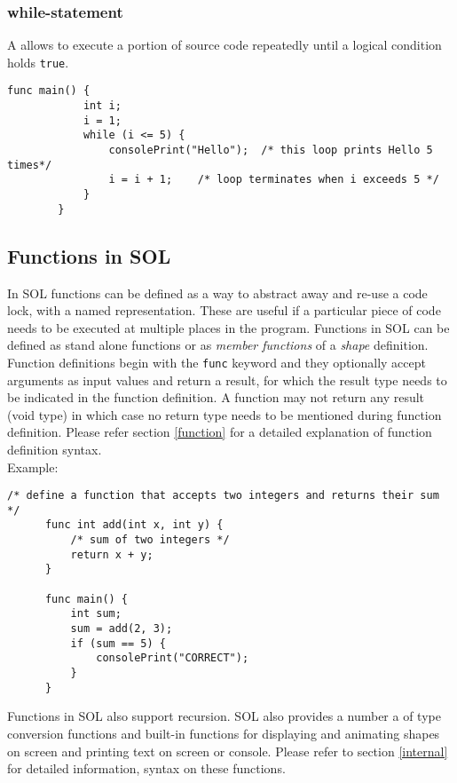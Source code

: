 \documentclass[letterpaper,12pt]{report}
\begin{document}
      \subsubsection{while-statement}
      A  allows to execute a portion of source code repeatedly until a logical condition holds \texttt{true}.
      \begin{lstlisting}[style=sol]
        func main() {
            int i;
            i = 1;
            while (i <= 5) {
                consolePrint("Hello");  /* this loop prints Hello 5 times*/
                i = i + 1;    /* loop terminates when i exceeds 5 */
            }
        }
      \end{lstlisting}

    \subsection{Functions in SOL}
    In SOL functions can be defined as a way to abstract away and re-use a code lock, with a named representation. These are useful if a particular piece of code needs to be executed at multiple places in the program. Functions in SOL can be defined as stand alone functions or as \textit{member functions} of a \textit{shape} definition. Function definitions begin with the \texttt{func} keyword and they optionally accept arguments as input values and return a result, for which the result type needs to be indicated in the function definition. A function may not return any result (void type) in which case no return type needs to be mentioned during function definition. Please refer section \ref{function} for a detailed explanation of function definition syntax.\\
    
    Example:\\
    \begin{lstlisting}[style=sol]
      /* define a function that accepts two integers and returns their sum */
      func int add(int x, int y) {
          /* sum of two integers */
          return x + y;
      }

      func main() {
          int sum;
          sum = add(2, 3);
          if (sum == 5) {
              consolePrint("CORRECT");
          }
      }
    \end{lstlisting}

    Functions in SOL also support recursion. SOL also provides a number a of type conversion functions and built-in functions for displaying and animating shapes on screen and printing text on screen or console. Please refer to section \ref{internal} for detailed information, syntax on these functions.
\end{document}

